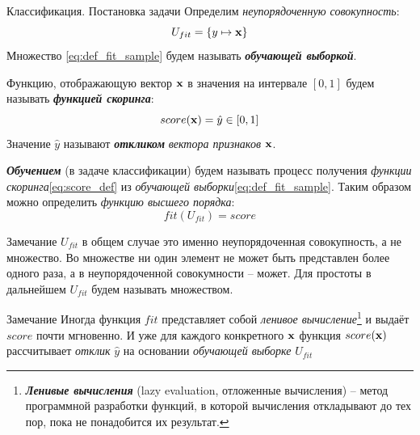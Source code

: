 \documentclass{beamer}
\newcommand{\termdef}[1]{\textbf{\textit{#1}}}
\newcommand{\term}{\textit}
\begin{document}
  \begin{frame}{Классификация. Постановка задачи}\label{frame:classification_def}
  	Определим \term{неупорядоченную совокупность}:
  	\begin{equation}\label{eq:def_fit_sample}
  	U_{fit} = \left\{ y \mapsto \bold x  \right\}
  	\end{equation}
  	Множество \eqref{eq:def_fit_sample} будем называть \termdef{обучающей выборкой}.
  	
  	Функцию, отображающую вектор $\bold x$ в значения на интервале $[0, 1]$ будем 
  	называть \termdef{функцией скоринга}:
  	\begin{equation}\label{eq:score_def}
  	score( \bold x) = \hat{y} \in [0, 1]
  	\end{equation}
  	Значение $\hat{y}$ называют \termdef{откликом} \term{вектора признаков} $\bold x$.
  	
  	\termdef{Обучением} (в задаче классификации) будем называть процесс получения 
  	\term{функции скоринга}\eqref{eq:score_def} 
  	из 
  	\term{обучающей выборки}\eqref{eq:def_fit_sample}.
  	Таким образом можно определить \term{функцию высшего порядка}:
  	\begin{equation}\label{eq:fit_def}
  	fit (U_{fit}) = score
  	\end{equation}
  \end{frame}

 \begin{frame}
	 \begin{block}{Замечание}
	 	$U_{fit}$ в общем случае это именно неупорядоченная совокупность, а не множество. Во множестве ни один элемент не может быть представлен более одного раза, а в неупорядоченной совокумности -- может. Для простоты в дальнейшем 	$U_{fit}$ будем называть множеством.
	 \end{block}
	\begin{block}{Замечание}
		Иногда функция $fit$ представляет собой \term{ленивое вычисление}\footnote{
		\termdef{Ленивые вычисления} (lazy evaluation, отложенные вычисления) -- 
		метод программной разработки функций, в которой вычисления откладывают до тех пор,
		пока не понадобится их результат.
		} и выдаёт $score$ почти мгновенно. И уже для каждого конкретного $\bold x$ функция
		$score(\bold x)$ рассчитывает \term{отклик} $\hat{y}$ на основании 
		\term{обучающей выборке} \term{} $U_{fit}$
	\end{block}
   \end{frame}
  
\end{document}
